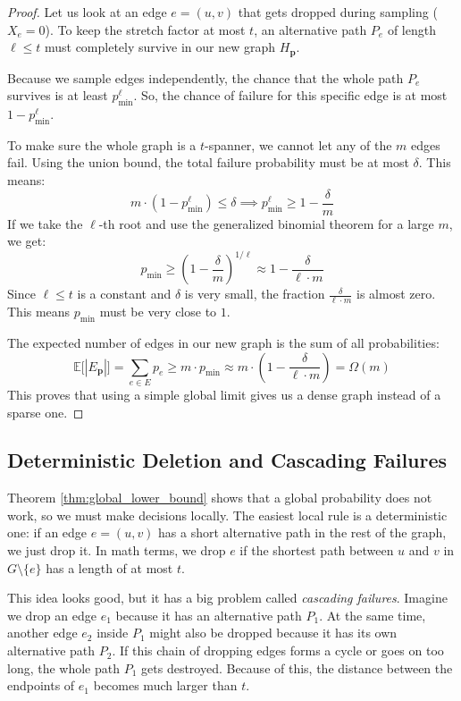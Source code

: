 \documentclass[11pt,a4paper]{article}
\newcommand{\E}{\mathbb{E}}
\begin{document}
\begin{proof}
Let us look at an edge $e = (u, v)$ that gets dropped during sampling ($X_e = 0$). To keep the stretch factor at most $t$, an alternative path $P_e$ of length $\ell \leq t$ must completely survive in our new graph $H_{\mathbf{p}}$. 

Because we sample edges independently, the chance that the whole path $P_e$ survives is at least $p_{\min}^\ell$. So, the chance of failure for this specific edge is at most $1 - p_{\min}^\ell$.

To make sure the whole graph is a $t$-spanner, we cannot let any of the $m$ edges fail. Using the union bound, the total failure probability must be at most $\delta$. This means:
\[
m \cdot \left(1 - p_{\min}^\ell\right) \leq \delta \implies p_{\min}^\ell \geq 1 - \frac{\delta}{m}
\]
If we take the $\ell$-th root and use the generalized binomial theorem for a large $m$, we get:
\[
p_{\min} \ge \left( 1 - \frac{\delta}{m} \right)^{1/\ell} \approx 1 - \frac{\delta}{\ell \cdot m}
\]
Since $\ell \leq t$ is a constant and $\delta$ is very small, the fraction $\frac{\delta}{\ell \cdot m}$ is almost zero. This means $p_{\min}$ must be very close to $1$. 

The expected number of edges in our new graph is the sum of all probabilities:
\[
\E\big[|E_{\mathbf{p}}|\big] = \sum_{e \in E} p_e \ge m \cdot p_{\min} \approx m \cdot \left(1 - \frac{\delta}{\ell \cdot m}\right) = \Omega(m)
\]
This proves that using a simple global limit gives us a dense graph instead of a sparse one.
\end{proof}

\subsection{Deterministic Deletion and Cascading Failures}
Theorem \ref{thm:global_lower_bound} shows that a global probability does not work, so we must make decisions locally. The easiest local rule is a deterministic one: if an edge $e = (u,v)$ has a short alternative path in the rest of the graph, we just drop it. In math terms, we drop $e$ if the shortest path between $u$ and $v$ in $G \setminus \{e\}$ has a length of at most $t$.

This idea looks good, but it has a big problem called \emph{cascading failures}. Imagine we drop an edge $e_1$ because it has an alternative path $P_1$. At the same time, another edge $e_2$ inside $P_1$ might also be dropped because it has its own alternative path $P_2$. If this chain of dropping edges forms a cycle or goes on too long, the whole path $P_1$ gets destroyed. Because of this, the distance between the endpoints of $e_1$ becomes much larger than $t$. 
\end{document}
